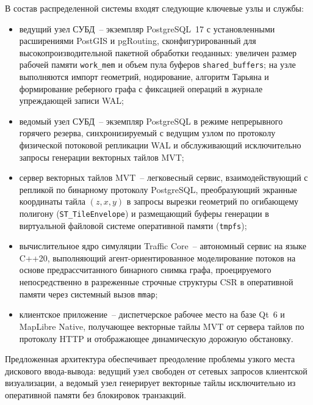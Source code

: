 В состав распределенной системы входят следующие ключевые узлы и службы:
\begin{itemize}
    \item ведущий узел СУБД~-- экземпляр PostgreSQL~17 с установленными расширениями PostGIS и pgRouting, сконфигурированный для высокопроизводительной пакетной обработки геоданных: увеличен размер рабочей памяти \texttt{work\_mem} и объем пула буферов \texttt{shared\_buffers}; на узле выполняются импорт геометрий, нодирование, алгоритм Тарьяна и формирование реберного графа с фиксацией операций в журнале упреждающей записи WAL;
    \item ведомый узел СУБД~-- экземпляр PostgreSQL в режиме непрерывного горячего резерва, синхронизируемый с ведущим узлом по протоколу физической потоковой репликации WAL и обслуживающий исключительно запросы генерации векторных тайлов MVT;
    \item сервер векторных тайлов MVT~-- легковесный сервис, взаимодействующий с репликой по бинарному протоколу PostgreSQL, преобразующий экранные координаты тайла $(z, x, y)$ в запросы вырезки геометрий по огибающему полигону (\texttt{ST\_TileEnvelope}) и размещающий буферы генерации в виртуальной файловой системе оперативной памяти (\texttt{tmpfs});
    \item вычислительное ядро симуляции Traffic Core~-- автономный сервис на языке C++20, выполняющий агент-ориентированное моделирование потоков на основе предрассчитанного бинарного снимка графа, проецируемого непосредственно в разреженные строчные структуры CSR в оперативной памяти через системный вызов \texttt{mmap};
    \item клиентское приложение~-- диспетчерское рабочее место на базе Qt~6 и MapLibre Native, получающее векторные тайлы MVT от сервера тайлов по протоколу HTTP и отображающее динамическую дорожную обстановку.
\end{itemize}

Предложенная архитектура обеспечивает преодоление проблемы узкого места дискового ввода-вывода: ведущий узел свободен от сетевых запросов клиентской визуализации, а ведомый узел генерирует векторные тайлы исключительно из оперативной памяти без блокировок транзакций.

